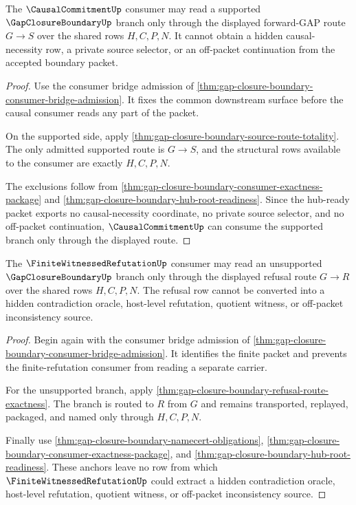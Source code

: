 \begin{theorem}
\label{thm:gap-closure-boundary-causal-commitment-forward-gap-unblock}
The $\CausalCommitmentUp$ consumer may read a supported $\GapClosureBoundaryUp$ branch only through the displayed forward-GAP route $G \longrightarrow S$ over the shared rows $H,C,P,N$. It cannot obtain a hidden causal-necessity row, a private source selector, or an off-packet continuation from the accepted boundary packet.
\end{theorem}
\begin{proof}
Use the consumer bridge admission of \autoref{thm:gap-closure-boundary-consumer-bridge-admission}. It fixes the common downstream surface before the causal consumer reads any part of the packet.

On the supported side, apply \autoref{thm:gap-closure-boundary-source-route-totality}. The only admitted supported route is $G \longrightarrow S$, and the structural rows available to the consumer are exactly $H,C,P,N$.

The exclusions follow from \autoref{thm:gap-closure-boundary-consumer-exactness-package} and \autoref{thm:gap-closure-boundary-hub-root-readiness}. Since the hub-ready packet exports no causal-necessity coordinate, no private source selector, and no off-packet continuation, $\CausalCommitmentUp$ can consume the supported branch only through the displayed route.
\end{proof}

\begin{theorem}
\label{thm:gap-closure-boundary-finite-refutation-route-unblock}
The $\FiniteWitnessedRefutationUp$ consumer may read an unsupported $\GapClosureBoundaryUp$ branch only through the displayed refusal route $G \longrightarrow R$ over the shared rows $H,C,P,N$. The refusal row cannot be converted into a hidden contradiction oracle, host-level refutation, quotient witness, or off-packet inconsistency source.
\end{theorem}
\begin{proof}
Begin again with the consumer bridge admission of \autoref{thm:gap-closure-boundary-consumer-bridge-admission}. It identifies the finite packet and prevents the finite-refutation consumer from reading a separate carrier.

For the unsupported branch, apply \autoref{thm:gap-closure-boundary-refusal-route-exactness}. The branch is routed to $R$ from $G$ and remains transported, replayed, packaged, and named only through $H,C,P,N$.

Finally use \autoref{thm:gap-closure-boundary-namecert-obligations}, \autoref{thm:gap-closure-boundary-consumer-exactness-package}, and \autoref{thm:gap-closure-boundary-hub-root-readiness}. These anchors leave no row from which $\FiniteWitnessedRefutationUp$ could extract a hidden contradiction oracle, host-level refutation, quotient witness, or off-packet inconsistency source.
\end{proof}
